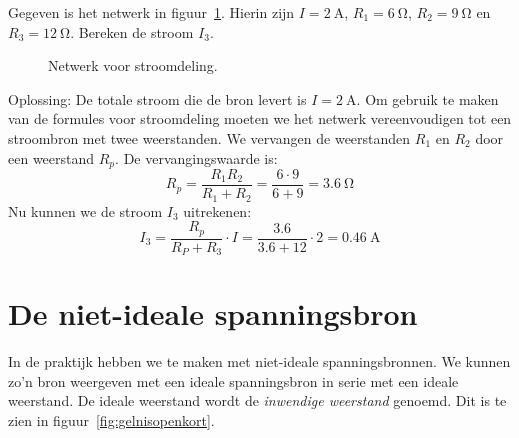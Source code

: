 \begin{example}[Stroomdeling]
Gegeven is het netwerk in figuur~\ref{fig:gelstroomdeling2}. Hierin zijn $I=\SI{2}{\ampere}$, $R_1=\SI{6}{\ohm}$,
$R_2=\SI{9}{\ohm}$ en $R_3=\SI{12}{\ohm}$. Bereken de stroom $I_3$.
\begin{figure}[H]
\centering
{}
\caption{Netwerk voor stroomdeling.}
\label{fig:gelstroomdeling2}
\end{figure}
Oplossing: De totale stroom die de bron levert is $I=\SI{2}{\ampere}$. Om gebruik te maken van de formules
voor stroomdeling moeten we het netwerk vereenvoudigen tot een stroombron met twee weerstanden. We vervangen
de weerstanden $R_1$ en $R_2$ door een weerstand $R_p$. De vervangingswaarde is:
\begin{equation}
R_p = \dfrac{R_1R_2}{R_1+R_2} = \dfrac{6\cdot9}{6+9} = \SI{3.6}{\ohm}
\end{equation}
Nu kunnen we de stroom $I_3$ uitrekenen:
\begin{equation}
I_3 = \dfrac{R_p}{R_P+R_3}\cdot I = \dfrac{\num{3.6}}{\num{3.6}+\num{12}}\cdot \num{2} = \SI{0.46}{\ampere}
\end{equation}
\end{example}


\section{De niet-ideale spanningsbron}
\label{sec:gelnietidealespanningsbron}
In de praktijk hebben we te maken met niet-ideale spanningsbronnen. We kunnen zo'n bron
weergeven met een ideale spanningsbron in serie met een ideale weerstand. De ideale
weerstand wordt de \textsl{inwendige weerstand} genoemd. Dit is te zien in
figuur~\ref{fig:gelnisopenkort}.

